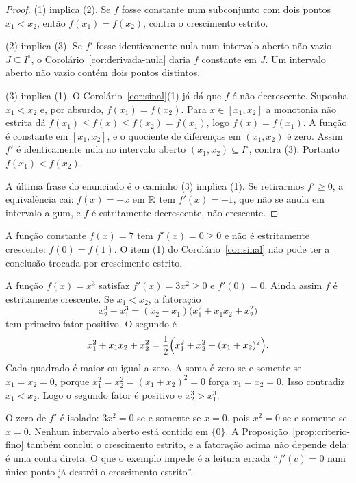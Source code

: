 \documentclass[11pt,a4paper]{article}
\begin{document}
\begin{proof}
(1) implica (2). Se $f$ fosse constante num subconjunto com dois pontos $x_1<x_2$, então $f(x_1)=f(x_2)$, contra o crescimento estrito.

(2) implica (3). Se $f'$ fosse identicamente nula num intervalo aberto não vazio $J\subseteq I^\circ$, o Corolário~\ref{cor:derivada-nula} daria $f$ constante em $J$. Um intervalo aberto não vazio contém dois pontos distintos.

(3) implica (1). O Corolário~\ref{cor:sinal}(1) já dá que $f$ é não decrescente. Suponha $x_1<x_2$ e, por absurdo, $f(x_1)=f(x_2)$. Para $x\in[x_1,x_2]$ a monotonia não estrita dá $f(x_1)\le f(x)\le f(x_2)=f(x_1)$, logo $f(x)=f(x_1)$. A função é constante em $[x_1,x_2]$, e o quociente de diferenças em $(x_1,x_2)$ é zero. Assim $f'$ é identicamente nula no intervalo aberto $(x_1,x_2)\subseteq I^\circ$, contra (3). Portanto $f(x_1)<f(x_2)$.

A última frase do enunciado é o caminho (3) implica (1). Se retirarmos $f'\ge 0$, a equivalência cai: $f(x)=-x$ em $\mathbb{R}$ tem $f'(x)=-1$, que não se anula em intervalo algum, e $f$ é estritamente decrescente, não crescente.
\end{proof}

\begin{contraexemplo}
A função constante $f(x)=7$ tem $f'(x)=0\ge 0$ e não é estritamente crescente: $f(0)=f(1)$. O item (1) do Corolário~\ref{cor:sinal} não pode ter a conclusão trocada por crescimento estrito.
\end{contraexemplo}

\begin{contraexemplo}
A função $f(x)=x^3$ satisfaz $f'(x)=3x^2\ge 0$ e $f'(0)=0$. Ainda assim $f$ é estritamente crescente. Se $x_1<x_2$, a fatoração
\[
x_2^3-x_1^3=(x_2-x_1)\bigl(x_1^2+x_1x_2+x_2^2\bigr)
\]
tem primeiro fator positivo. O segundo é
\[
x_1^2+x_1x_2+x_2^2=\frac12\Bigl(x_1^2+x_2^2+(x_1+x_2)^2\Bigr).
\]
Cada quadrado é maior ou igual a zero. A soma é zero se e somente se $x_1=x_2=0$, porque $x_1^2=x_2^2=(x_1+x_2)^2=0$ força $x_1=x_2=0$. Isso contradiz $x_1<x_2$. Logo o segundo fator é positivo e $x_2^3>x_1^3$.

O zero de $f'$ é isolado: $3x^2=0$ se e somente se $x=0$, pois $x^2=0$ se e somente se $x=0$. Nenhum intervalo aberto está contido em $\{0\}$. A Proposição~\ref{prop:criterio-fino} também conclui o crescimento estrito, e a fatoração acima não depende dela: é uma conta direta. O que o exemplo impede é a leitura errada ``$f'(c)=0$ num único ponto já destrói o crescimento estrito''.
\end{contraexemplo}
\end{document}
